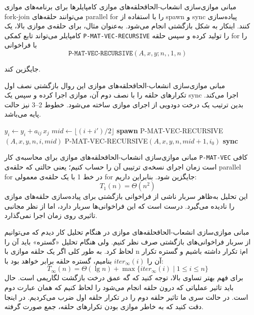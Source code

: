\begin{itemframe-s}{مبانی موازی‌سازی انشعاب-الحاق}{حلقه‌های موازی}
\itm
کامپایلرها برای برنامه‌های موازی fork-join می‌توانند حلقه‌های parallel for را با استفاده از spawn و sync پیاده‌سازی کنند. اینکار به شکل بازگشتی انجام می‌شود.
\itm
به‌عنوان مثال، برای حلقه‌ی موازی بالا، یک کامپایلر می‌تواند تابع کمکی
\texttt{P-MAT-VEC-RECURSIVE}
را تولید کرده و سپس حلقه for را با فراخوانی
$$\texttt{P-MAT-VEC-RECURSIVE}(A, x, y; n, ,1, n)$$

جایگزین کند.
\end{itemframe-s}


\begin{itemframe-s}{مبانی موازی‌سازی انشعاب-الحاق}{حلقه‌های موازی}
\itm
این روال بازگشتی نصف اول تکرارهای حلقه را با نصف دوم آن، موازی اجرا کرده و سپس یک sync اجرا می‌کند.
بدین ترتیب یک درخت دودویی از اجرای موازی ساخته می‌شود. خطوط 2–3 نیز حالت پایه می‌باشد.
\begin{algorithm}[H]\alglr
\caption{P-MAT-VEC-RECURSIVE}
\begin{algorithmic}[1]
 
     
        \State $y_i \gets y_i + a_{ij} \, x_j$
    \EndFor
\Else
    \State $mid \gets \lfloor (i + i')/2 \rfloor$ 
    \State \textbf{spawn} P-MAT-VEC-RECURSIVE$(A, x, y, n, i, mid)$
    \State P-MAT-VEC-RECURSIVE$(A, x, y, n, mid+1, i_0)$
    \State \textbf{sync}
\EndIf
\end{algorithmic}
\end{algorithm}

\end{itemframe-s}


\begin{itemframe-s}{مبانی موازی‌سازی انشعاب-الحاق}{حلقه‌های موازی}
\itm
برای محاسبه‌ی کار
\texttt{P-MAT-VEC}
کافی است زمان اجرای نسخه‌ی ترتیبی آن را حساب کنیم؛ یعنی حالتی که حلقه‌ی parallel for در خط 1 با یک حلقه‌ی معمولی for جایگزین شود. بنابراین داریم:
$$
T_1(n) = \Theta(n^2)
$$
\itm
این تحلیل به‌ظاهر سربار ناشی از فراخوانی بازگشتی برای پیاده‌سازی حلقه‌های موازی را نادیده می‌گیرد.
درست است که این فراخوانی‌ها سربار دارد، اما از نظر مجانبی تاثیری روی زمان اجرا نمی‌گذارد.
\end{itemframe-s}


\begin{itemframe-s}{مبانی موازی‌سازی انشعاب-الحاق}{حلقه‌های موازی}
\itm
در هنگام تحلیل کار دیدم که می‌توانیم از سربار فراخوانی‌های بازگشتی صرف نظر کنیم. ولی هنگام تحلیل «گستره» باید آن را لحاظ کرد.
\itm
به طور کلی اگر یک حلقه موازی با n تکرار داشته باشیم و گستره تکرار iام آن را
$iter_\infty(i)$
بنامیم، گستره حلقه برابر خواهد بود با:
$$
T_\infty(n) = \Theta(\lg n) + \max \{ iter_\infty(i) \mid 1 \leq i \leq n \}
$$
\itm
برای فهم بهتر تساوی بالا، توجه کنید که گه عمق درخت بازگشت لگاریمی است. حال باید تاثیر عملیاتی که درون حلقه انجام می‌شود را لحاظ کنیم که همان عبارت دوم است. در حالت سری ما تاثیر حلقه دوم را در تکرار حلقه اول ضرب می‌کردیم. در اینجا دقت کنید که به خاطر موازی بودن تکرارهای حلقه، جمع صورت گرفته.
\end{itemframe-s}


